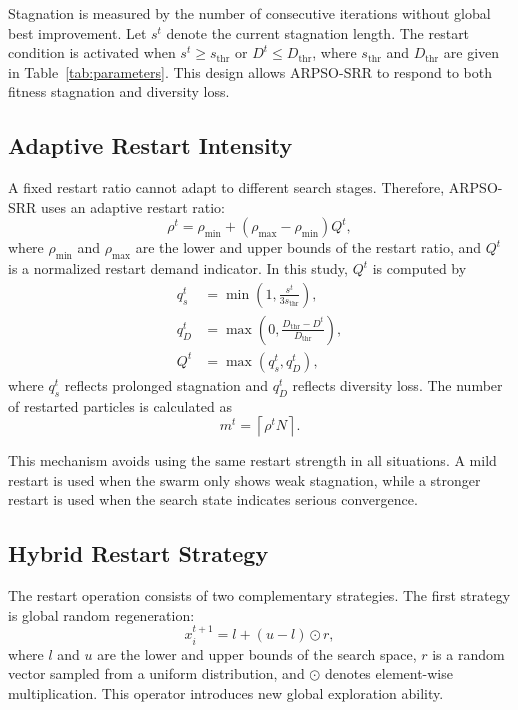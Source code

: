 \documentclass[conference]{IEEEtran}
\begin{document}
Stagnation is measured by the number of consecutive iterations without global best improvement. Let $s^t$ denote the current stagnation length. The restart condition is activated when $s^t\ge s_{\mathrm{thr}}$ or $D^t\le D_{\mathrm{thr}}$, where $s_{\mathrm{thr}}$ and $D_{\mathrm{thr}}$ are given in Table~\ref{tab:parameters}. This design allows ARPSO-SRR to respond to both fitness stagnation and diversity loss.

\subsection{Adaptive Restart Intensity}
A fixed restart ratio cannot adapt to different search stages. Therefore, ARPSO-SRR uses an adaptive restart ratio:
\begin{equation}
    \rho^t=\rho_{\min}+(\rho_{\max}-\rho_{\min})Q^t,
    \label{eq:restart_ratio}
\end{equation}
where $\rho_{\min}$ and $\rho_{\max}$ are the lower and upper bounds of the restart ratio, and $Q^t$ is a normalized restart demand indicator. In this study, $Q^t$ is computed by
\begin{equation}
\begin{aligned}
q_s^t &= \min\left(1,\frac{s^t}{3s_{\mathrm{thr}}}\right),\\
q_D^t &= \max\left(0,\frac{D_{\mathrm{thr}}-D^t}{D_{\mathrm{thr}}}\right),\\
Q^t &= \max(q_s^t,q_D^t),
\end{aligned}
\label{eq:restart_demand}
\end{equation}
where $q_s^t$ reflects prolonged stagnation and $q_D^t$ reflects diversity loss. The number of restarted particles is calculated as
\begin{equation}
    m^t=\left\lceil \rho^t N \right\rceil .
    \label{eq:restart_number}
\end{equation}

This mechanism avoids using the same restart strength in all situations. A mild restart is used when the swarm only shows weak stagnation, while a stronger restart is used when the search state indicates serious convergence.

\subsection{Hybrid Restart Strategy}
The restart operation consists of two complementary strategies. The first strategy is global random regeneration:
\begin{equation}
    x_i^{t+1}=l+(u-l)\odot r,
    \label{eq:global_restart}
\end{equation}
where $l$ and $u$ are the lower and upper bounds of the search space, $r$ is a random vector sampled from a uniform distribution, and $\odot$ denotes element-wise multiplication. This operator introduces new global exploration ability.
\end{document}
